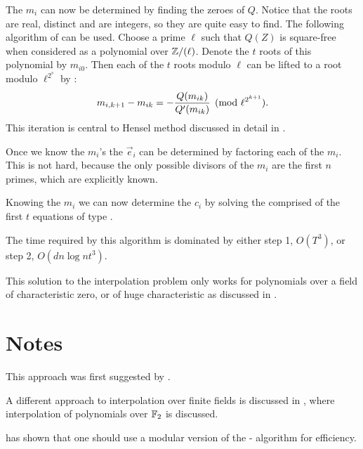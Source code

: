 The $m_i$ can now be determined by finding the zeroes of $Q$.  Notice
that the roots are real, distinct and are integers, so they are quite
easy to find.  The following algorithm of {\Loos} \cite{Loos1983-nu} can be
used.  Choose a prime $\ell$ such that $Q(Z)$ is square-free when
considered as a polynomial over $\mathbb{Z}/(\ell)$.  Denote the $t$ roots of
this polynomial by $m_{i0}$.  Then each of the $t$ roots modulo $\ell$
can be lifted to a root modulo $\ell^{2^s}$ by :
\[
m_{i,k+1} - m_{ik} = - {Q(m_{ik}) \over Q'(m_{ik})} \pmod{\ell^{2^{k+1}}}.
\]
This iteration is central to Hensel method discussed in detail in
.

Once we know the $m_i$'s the $\vec e_i$ can be determined by factoring each of
the $m_i$.  This is not hard, because the only possible divisors of the $m_i$
are the first $n$ primes, which are explicitly known.

Knowing the $m_i$ we can now determine the $c_i$ by solving the
 comprised of the first $t$ equations of type
.

The time required by this algorithm is dominated by either step 1,
$O(T^3)$, or step 2, $O(dn \log n t^3)$.

\medskip
This solution to the interpolation problem only works for polynomials
over a field of characteristic zero, or of huge characteristic as
discussed in .

\section*{Notes}

\small

 This approach was first suggested by
{\BrownWS} \cite{Brown1971-jr}.

  A different  approach to
interpolation over finite fields is discussed in \cite{Roth1991-tr}, where
interpolation of polynomials over $\mathbb{F}_2$ is discussed.

  {\Kaltofen} \cite{Kaltofen1990-gz} has shown
that one should use a modular version of the {\BenOr}-{\Tiwari}
algorithm for efficiency.

\normalsize
